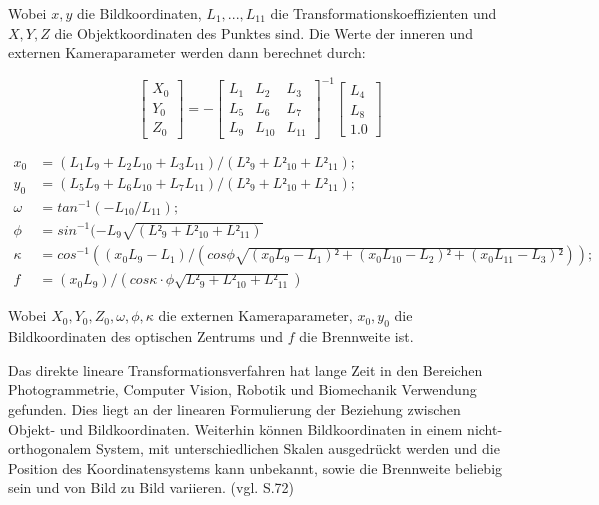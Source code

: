 Wobei $x,y$ die Bildkoordinaten, $L_1,...,L_{11}$ die Transformationskoeffizienten und $X,Y,Z$ die Objektkoordinaten des Punktes sind. Die Werte der inneren und externen Kameraparameter werden dann berechnet durch:

\begin{equation}
\begin{bmatrix}
X_0 \\ Y_0 \\ Z_0 
\end{bmatrix}
 = -
 \begin{bmatrix}
 L_1 & L_2 & L_3 \\
 L_5 & L_6 & L_7 \\
 L_9 & L_{10} & L_{11}
 \end{bmatrix}^{-1}
 \begin{bmatrix}
 L_4 \\ L_8 \\ 1.0
 \end{bmatrix}
 \end{equation}
 
 \begin{equation}
 \begin{aligned}
 x_0 &= (L_1L_9 + L_2L_{10} + L_3L_{11})/(L²_9 + L²_{10} + L²_{11}); \\
 y_0 &= (L_5L_9 + L_6L_{10} + L_7L_{11})/(L²_9 + L²_{10} + L²_{11}); \\
 \omega &= tan^{-1}(-L_{10}/L_{11}); \\
 \phi &= sin^{-1}(-L_9 \sqrt{(L²_9 + L²_{10} + L²_{11})} \\
  \kappa &= cos^{-1}((x_0L_9 - L_1)/(cos \phi \sqrt{(x_0L_9-L_1)² + (x_0L_{10}-L_2)² + (x_0L_{11}-L_3)²})); \\
 f&=(x_0L_9)/(cos \kappa \cdot \phi \sqrt{L²_9 + L²_{10} + L²_{11}}) 
 \end{aligned}
 \end{equation}

Wobei $X_0,Y_0,Z_0,\omega ,\phi , \kappa $ die externen Kameraparameter, $x_0,y_0$ die Bildkoordinaten des optischen Zentrums und $f$ die Brennweite ist. 

Das direkte lineare Transformationsverfahren hat lange Zeit in den Bereichen Photogrammetrie, Computer Vision, Robotik und Biomechanik Verwendung gefunden. Dies liegt an der linearen Formulierung der Beziehung zwischen Objekt- und Bildkoordinaten. Weiterhin können Bildkoordinaten in einem nicht-orthogonalem System, mit unterschiedlichen Skalen ausgedrückt werden und die Position des Koordinatensystems kann unbekannt, sowie die Brennweite beliebig sein und von Bild zu Bild variieren. (vgl. \cite{dlt} S.72)

